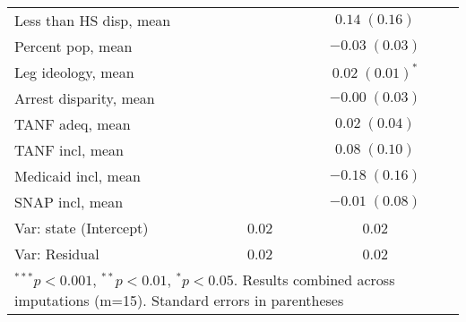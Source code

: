 \begin{table}
\begin{center}
\begin{tabular}{l c c }
Less than HS disp, mean    &                         & $0.14 \; (0.16)$        \\
Percent pop, mean          &                         & $-0.03 \; (0.03)$       \\
Leg ideology, mean         &                         & $0.02 \; (0.01)^{*}$    \\
Arrest disparity, mean     &                         & $-0.00 \; (0.03)$       \\
TANF adeq, mean            &                         & $0.02 \; (0.04)$        \\
TANF incl, mean            &                         & $0.08 \; (0.10)$        \\
Medicaid incl, mean        &                         & $-0.18 \; (0.16)$       \\
SNAP incl, mean            &                         & $-0.01 \; (0.08)$       \\
\hline
Var: state (Intercept)     & 0.02                    & 0.02                    \\
Var: Residual              & 0.02                    & 0.02                    \\
\hline
\multicolumn{3}{l}{\scriptsize{$^{***}p<0.001$, $^{**}p<0.01$, $^*p<0.05$. Results combined across imputations (m=15). Standard errors in parentheses}}
\end{tabular}
\label{table:coefficients}
\end{center}
\end{table}
